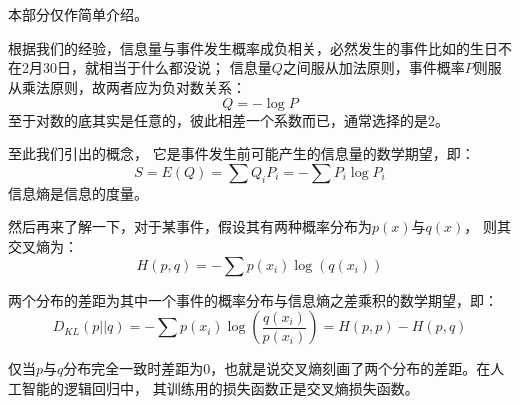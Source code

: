     \section[信息]{}
        本部分仅作简单介绍。
        
        根据我们的经验，信息量与事件发生概率成负相关，必然发生的事件比如\dove 的生日不在2月30日，就相当于什么都没说；
        信息量$Q$之间服从加法原则，事件概率$P$则服从乘法原则，故两者应为负对数关系：
        \begin{equation}
            Q = - \log P
            \nonumber
        \end{equation}
        至于对数的底其实是任意的，彼此相差一个系数而已，通常选择的是$2$。

        至此我们引出的概念，
        它是事件发生前可能产生的信息量的数学期望，即：
        \begin{equation}
            S = E(Q) = \sum Q_{i}P_{i} = -\sum P_{i}\log P_{i}
            \nonumber
        \end{equation}
        信息熵是信息的度量。

        然后再来了解一下，对于某事件，假设其有两种概率分布为$p(x)$与$q(x)$，
        则其交叉熵为：
        \begin{equation}
            H(p,q) = - \sum p({x_{i}})\log(q({x_{i}}))
            \nonumber
        \end{equation}

        两个分布的差距为其中一个事件的概率分布与信息熵之差乘积的数学期望，即：
        \begin{equation}
            D_{KL}(p||q) = - \sum p({x_{i}})\log\left(\frac{q({x_{i}})}{p({x_{i}})}\right) = H(p,p)-H(p,q)
            \nonumber
        \end{equation} 

        仅当$p$与$q$分布完全一致时差距为0，也就是说交叉熵刻画了两个分布的差距。在人工智能的逻辑回归中，
        其训练用的损失函数正是交叉熵损失函数。
%
